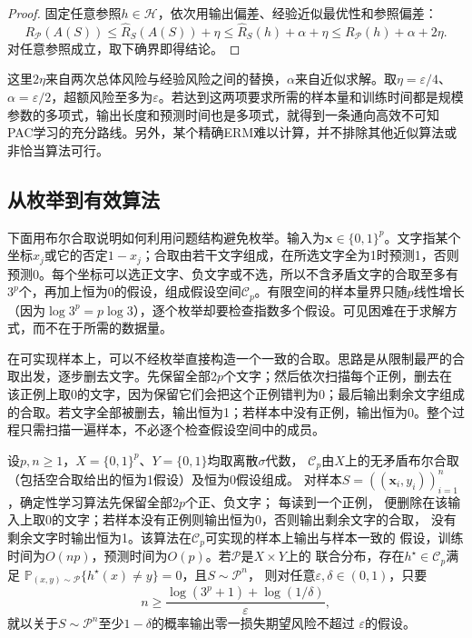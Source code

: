 \begin{proof}
固定任意参照$h\in\mathcal H$，依次用输出偏差、经验近似最优性和参照偏差：
\[
 R_{\mathcal P}(A(S))
 \leq\hat R_S(A(S))+\eta
 \leq\hat R_S(h)+\alpha+\eta
 \leq R_{\mathcal P}(h)+\alpha+2\eta.
\]
对任意参照成立，取下确界即得结论。
\end{proof}

这里$2\eta$来自两次总体风险与经验风险之间的替换，$\alpha$来自近似求解。取$\eta=\varepsilon/4$、$\alpha=\varepsilon/2$，超额风险至多为$\varepsilon$。若达到这两项要求所需的样本量和训练时间都是规模参数的多项式，输出长度和预测时间也是多项式，就得到一条通向高效不可知PAC学习的充分路线。另外，某个精确ERM难以计算，并不排除其他近似算法或非恰当算法可行。

\subsection{从枚举到有效算法}

下面用布尔合取说明如何利用问题结构避免枚举。输入为$\bm x\in\{0,1\}^p$。文字指某个坐标$x_j$或它的否定$1-x_j$；合取由若干文字组成，在所选文字全为1时预测1，否则预测0。每个坐标可以选正文字、负文字或不选，所以不含矛盾文字的合取至多有$3^p$个，再加上恒为0的假设，组成假设空间$\mathcal C_p$。有限空间的样本量界只随$p$线性增长（因为$\log3^p=p\log3$），逐个枚举却要检查指数多个假设。可见困难在于求解方式，而不在于所需的数据量。

在可实现样本上，可以不经枚举直接构造一个一致的合取。思路是从限制最严的合取出发，逐步删去文字。先保留全部$2p$个文字；然后依次扫描每个正例，删去在该正例上取0的文字，因为保留它们会把这个正例错判为0；最后输出剩余文字组成的合取。若文字全部被删去，输出恒为1；若样本中没有正例，输出恒为0。整个过程只需扫描一遍样本，不必逐个检查假设空间中的成员。

\begin{theorem}[布尔合取的高效可实现学习]
\label{thm:efficient-conjunction-learning}
设$p,n\geq1$，$X=\{0,1\}^p$、$Y=\{0,1\}$均取离散$\sigma$代数，
$\mathcal C_p$由$X$上的无矛盾布尔合取（包括空合取给出的恒为1假设）及恒为0假设组成。
对样本$S=((\bm x_i,y_i))_{i=1}^n$，确定性学习算法先保留全部$2p$个正、负文字；
每读到一个正例，
便删除在该输入上取0的文字；若样本没有正例则输出恒为0，否则输出剩余文字的合取，
没有剩余文字时输出恒为1。该算法在$\mathcal C_p$可实现的样本上输出与样本一致的
假设，训练时间为$O(np)$，预测时间为$O(p)$。若$\mathcal P$是$X\times Y$上的
联合分布，存在$h^\star\in\mathcal C_p$满足
$\mathbb P_{(x,y)\sim\mathcal P}\{h^\star(x)\neq y\}=0$，且$S\sim\mathcal P^n$，
则对任意$\varepsilon,\delta\in(0,1)$，只要
\[
 n\geq\frac{\log(3^p+1)+\log(1/\delta)}{\varepsilon},
\]
就以关于$S\sim\mathcal P^n$至少$1-\delta$的概率输出零一损失期望风险不超过
$\varepsilon$的假设。
\end{theorem}

